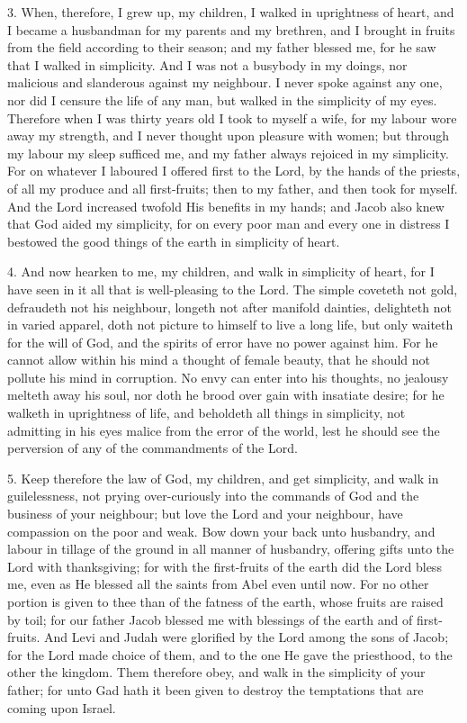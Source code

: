 3. When, therefore, I grew up, my children, I walked in uprightness of heart, and I became a husbandman for my parents and my brethren, and I brought in fruits from the field according to their season; and my father blessed me, for he saw that I walked in simplicity. And I was not a busybody in my doings, nor malicious and slanderous against my neighbour. I never spoke against any one, nor did I censure the life of any man, but walked in the simplicity of my eyes. Therefore when I was thirty years old I took to myself a wife, for my labour wore away my strength, and I never thought upon pleasure with women; but through my labour my sleep sufficed me, and my father always rejoiced in my simplicity. For on whatever I laboured I offered first to the Lord, by the hands of the priests, of all my produce and all first-fruits; then to my father, and then took for myself. And the Lord increased twofold His benefits in my hands; and Jacob also knew that God aided my simplicity, for on every poor man and every one in distress I bestowed the good things of the earth in simplicity of heart.

4. And now hearken to me, my children, and walk in simplicity of heart, for I have seen in it all that is well-pleasing to the Lord. The simple coveteth not gold, defraudeth not his neighbour, longeth not after manifold dainties, delighteth not in varied apparel, doth not picture to himself to live a long life, but only waiteth for the will of God, and the spirits of error have no power against him. For he cannot allow within his mind a thought of female beauty, that he should not pollute his mind in corruption. No envy can enter into his thoughts, no jealousy melteth away his soul, nor doth he brood over gain with insatiate desire; for he walketh in uprightness of life, and beholdeth all things in simplicity, not admitting in his eyes malice from the error of the world, lest he should see the perversion of any of the commandments of the Lord.

5. Keep therefore the law of God, my children, and get simplicity, and walk in guilelessness, not prying over-curiously into the commands of God and the business of your neighbour; but love the Lord and your neighbour, have compassion on the poor and weak. Bow down your back unto husbandry, and labour in tillage of the ground in all manner of husbandry, offering gifts unto the Lord with thanksgiving; for with the first-fruits of the earth did the Lord bless me, even as He blessed all the saints from Abel even until now. For no other portion is given to thee than of the fatness of the earth, whose fruits are raised by toil; for our father Jacob blessed me with blessings of the earth and of first-fruits. And Levi and Judah were glorified by the Lord among the sons of Jacob; for the Lord made choice of them, and to the one He gave the priesthood, to the other the kingdom. Them therefore obey, and walk in the simplicity of your father; for unto Gad hath it been given to destroy the temptations that are coming upon Israel.

